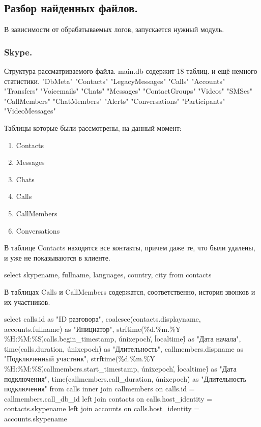 \subsection{Разбор найденных файлов.}

В зависимости от обрабатываемых логов, запускается нужный модуль.\\ 
\subsubsection {Skype.}
Структура рассматриваемого файла.
main.db  содержит 18 таблиц. и ещё немного статистики.
"DbMeta"   
"Contacts"   
"LegacyMessages"
"Calls"     
"Accounts"   
"Transfers"   
"Voicemails"   
"Chats"      
"Messages"   
"ContactGroups"  
"Videos"   
"SMSes"
"CallMembers"   
"ChatMembers"   
"Alerts"
"Conversations"     
"Participants"   
"VideoMessages"

Таблицы которые были рассмотрены, на данный момент:    
 \begin{enumerate}
\item Contacts
\item Messages
\item Chats
\item Calls
\item CallMembers
\item Conversations
\end{enumerate}

В таблице Contacts находятся все контакты, причем даже те, что были удалены, и уже не показываются в клиенте.

select skypename, 
       fullname, 
       languages, 
       country,
       city 
  from contacts

В таблицах Calls и CallMembers содержатся, соответственно, история звонков и их участников.

select calls.id as "ID разговора",
       coalesce(contacts.displayname, accounts.fullname) as "Инициатор",
       strftime(\'\%d.\%m.\%Y \%H:\%M:\%S\',calls.begin\_timestamp, \'unixepoch\', \'localtime\') as "Дата начала",
       time(calls.duration, \'unixepoch\') as "Длительность",
       callmembers.dispname as "Подключенный участник",
       strftime(\'\%d.\%m.\%Y \%H:\%M:\%S\',callmembers.start\_timestamp, \'unixepoch\', \'localtime\') as "Дата подключения",
       time(callmembers.call\_duration, \'unixepoch\') as "Длительность подключения"
  from calls
       inner join callmembers on calls.id = callmembers.call\_db\_id
       left  join contacts on calls.host\_identity = contacts.skypename
       left  join accounts on calls.host\_identity = accounts.skypename


